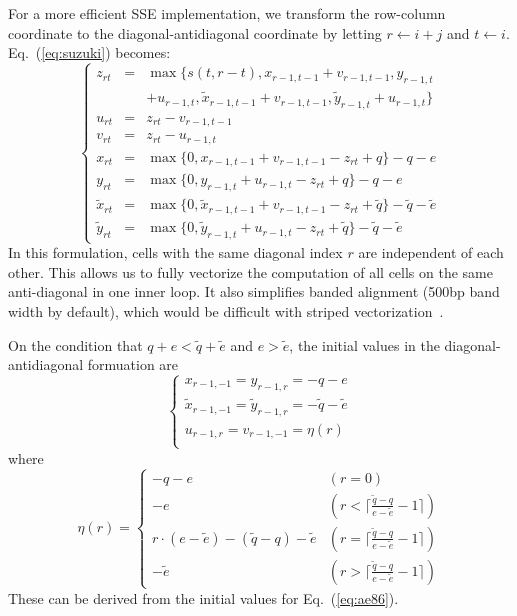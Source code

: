 \documentclass{bioinfo}
\begin{document}
\begin{methods}
For a more efficient SSE implementation, we transform the row-column coordinate
to the diagonal-antidiagonal coordinate by letting $r\gets i+j$ and $t\gets i$.
Eq.~(\ref{eq:suzuki}) becomes:
\begin{equation*}
\left\{\begin{array}{lll}
z_{rt}&=&\max\{s(t,r-t),x_{r-1,t-1}+v_{r-1,t-1},y_{r-1,t}\\
&&+u_{r-1,t},\tilde{x}_{r-1,t-1}+v_{r-1,t-1},\tilde{y}_{r-1,t}+u_{r-1,t}\}\\
u_{rt}&=&z_{rt}-v_{r-1,t-1}\\
v_{rt}&=&z_{rt}-u_{r-1,t}\\
x_{rt}&=&\max\{0,x_{r-1,t-1}+v_{r-1,t-1}-z_{rt}+q\}-q-e\\
y_{rt}&=&\max\{0,y_{r-1,t}+u_{r-1,t}-z_{rt}+q\}-q-e\\
\tilde{x}_{rt}&=&\max\{0,\tilde{x}_{r-1,t-1}+v_{r-1,t-1}-z_{rt}+\tilde{q}\}-\tilde{q}-\tilde{e}\\
\tilde{y}_{rt}&=&\max\{0,\tilde{y}_{r-1,t}+u_{r-1,t}-z_{rt}+\tilde{q}\}-\tilde{q}-\tilde{e}
\end{array}\right.
\end{equation*}
In this formulation, cells with the same diagonal index $r$ are independent of
each other. This allows us to fully vectorize the computation of all cells on
the same anti-diagonal in one inner loop. It also simplifies banded alignment (500bp band width by default),
which would be difficult with striped vectorization~\citep{Farrar:2007hs}.

On the condition that $q+e<\tilde{q}+\tilde{e}$ and $e>\tilde{e}$, the initial
values in the diagonal-antidiagonal formuation are
\[
\left\{\begin{array}{l}
x_{r-1,-1}=y_{r-1,r}=-q-e\\
\tilde{x}_{r-1,-1}=\tilde{y}_{r-1,r}=-\tilde{q}-\tilde{e}\\
u_{r-1,r}=v_{r-1,-1}=\eta(r)\\
\end{array}\right.
\]
where
\[
\eta(r)=\left\{\begin{array}{ll}
-q-e & (r=0) \\
-e & (r<\lceil\frac{\tilde{q}-q}{e-\tilde{e}}-1\rceil) \\
r\cdot(e-\tilde{e})-(\tilde{q}-q)-\tilde{e} & (r=\lceil\frac{\tilde{q}-q}{e-\tilde{e}}-1\rceil) \\
-\tilde{e} & (r>\lceil\frac{\tilde{q}-q}{e-\tilde{e}}-1\rceil)
\end{array}\right.
\]
These can be derived from the initial values for Eq.~(\ref{eq:ae86}).


\end{methods}
\end{document}
